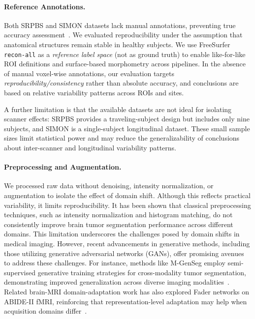 \documentclass{midl} %
\begin{document}

\paragraph{Reference Annotations.} Both SRPBS and SIMON datasets lack manual annotations, preventing true accuracy assessment~\citep{Kofler2023PeakGroundTruth}. We evaluated reproducibility under the assumption that anatomical structures remain stable in healthy subjects. We use FreeSurfer \texttt{recon-all} as a \emph{reference label space} (not as ground truth) to enable like-for-like ROI definitions and surface-based morphometry across pipelines. In the absence of manual voxel-wise annotations, our evaluation targets \emph{reproducibility/consistency} rather than absolute accuracy, and conclusions are based on relative variability patterns across ROIs and sites.

A further limitation is that the available datasets are not ideal for isolating scanner effects: SRPBS provides a traveling-subject design but includes only nine subjects, and SIMON is a single-subject longitudinal dataset. These small sample sizes limit statistical power and may reduce the generalizability of conclusions about inter-scanner and longitudinal variability patterns.

\paragraph{Preprocessing and Augmentation.} We processed raw data without denoising, intensity normalization, or augmentation to isolate the effect of domain shift. Although this reflects practical variability, it limits reproducibility. It has been shown that classical preprocessing techniques, such as intensity normalization and histogram matching, do not consistently improve brain tumor segmentation performance across different domains. This limitation underscores the challenges posed by domain shifts in medical imaging. However, recent advancements in generative methods, including those utilizing generative adversarial networks (GANs), offer promising avenues to address these challenges. For instance, methods like M-GenSeg employ semi-supervised generative training strategies for cross-modality tumor segmentation, demonstrating improved generalization across diverse imaging modalities~\cite{alefsende2022m}. Related brain-MRI domain-adaptation work has also explored Fader networks on ABIDE-II fMRI, reinforcing that representation-level adaptation may help when acquisition domains differ~\citep{Pominova2021Fader}.
\end{document}
